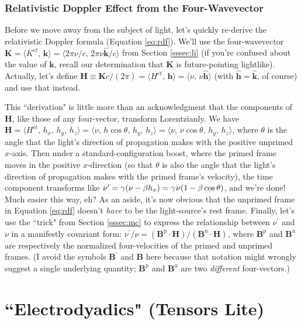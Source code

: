 \documentclass[12pt]{article}
\renewcommand{\vv}[1]{\mathbf{#1}}
\begin{document}
\subsubsection{Relativistic Doppler Effect from the Four-Wavevector}

Before we move away from the subject of light, let's quickly re-derive the relativistic Doppler formula (Equation \ref{eq:rdf}). We'll use the four-wavevector ${\vv K = \langle K^{ct}, \, \vv k \rangle = \langle 2 \pi \nu / c, \, 2 \pi \nu \vv{\hat{k}} / c \rangle }$ from Section \ref{sssec:li} (if you're confused about the value of $\vv k$, recall our determination that $\vv K$ is future-pointing lightlike). Actually, let's define ${\vv H \equiv \vv K c / (2 \pi) = \langle H^{ct}, \, \vv h \rangle = \langle \nu, \, \nu \vv{\hat{h}} \rangle }$ (with $\vv{\hat{h}} = \vv{\hat{k}}$, of course) and use that instead.

This ``derivation" is little more than an acknowledgment that the components of $\vv H$, like those of any four-vector, transform Lorentzianly. We have ${\vv H = \langle H^{ct}, \, h_x, \, h_y, \, h_z \rangle = \langle \nu , \, h \cos \theta, \, h_y, \, h_z \rangle = \langle \nu , \, \nu \cos \theta, \, h_y, \, h_z \rangle}$, where $\theta$ is the angle that the light's direction of propagation makes with the positive unprimed $x$-axis. Then under a standard-configuration boost, where the primed frame moves in the positive $x$-direction (so that $\theta$ is also the angle that the light's direction of propagation makes with the primed frame's velocity), the time component transforms like $\nu ^{\prime} = \gamma (\nu - \beta h_x ) = \gamma \mkern1mu \nu (1 - \beta \cos \theta)$, and we're done! Much easier this way, eh? As an aside, it's now obvious that the unprimed frame in Equation \ref{eq:rdf} doesn't \emph{have} to be the light-source's rest frame. Finally, let's use the ``trick" from Section \ref{sssec:mc} to express the relationship between $\nu ^{\prime}$ and $\nu$ in a manifestly covariant form: $\nu ^{\prime} / \nu = (\vv B^{\textrm{p}} \cdot \vv H) / (\vv B^{\textrm{u}} \cdot \vv H)$, where $\vv B^{\textrm{p}}$ and $\vv B^{\textrm{u}}$ are respectively the normalized four-velocities of the primed and unprimed frames. (I avoid the symbols $\vv B ^{\prime}$ and $\vv B$ here because that notation might wrongly suggest a single underlying quantity; $\vv B^{\textrm{p}}$ and $\vv B^{\textrm{u}}$ are two \emph{different} four-vectors.)


\clearpage

\section["Electrodyadics" (Tensors Lite)]{``Electrodyadics" (Tensors Lite)}\label{ssec:dy}
\end{document}
